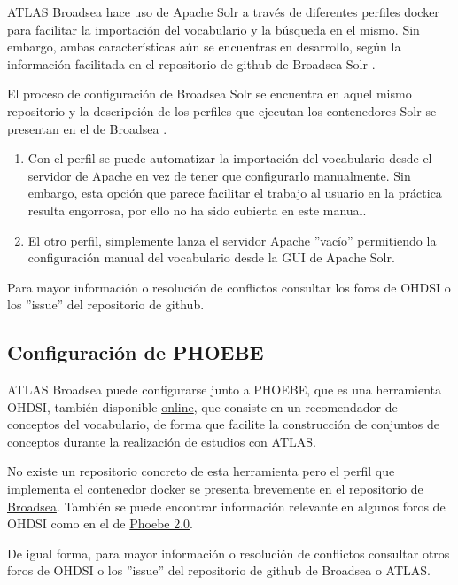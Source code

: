 ATLAS Broadsea hace uso de Apache Solr a través de diferentes perfiles docker para facilitar la importación del vocabulario y la búsqueda en el mismo. Sin embargo, ambas características aún se encuentras en desarrollo, según la información facilitada en el repositorio de github de Broadsea Solr \cite{githubBroadseaSolr}.

El proceso de configuración de Broadsea Solr se encuentra en aquel mismo repositorio y la descripción de los perfiles que ejecutan los contenedores Solr se presentan en el de Broadsea \cite{githubBroadsea}. 

\begin{enumerate}
    \item Con el perfil  se puede automatizar la importación del vocabulario desde el servidor de Apache en vez de tener que configurarlo manualmente. Sin embargo, esta opción que parece facilitar el trabajo al usuario en la práctica resulta engorrosa, por ello no ha sido cubierta en este manual.
    \item El otro perfil,  simplemente lanza el servidor Apache ''vacío'' permitiendo la configuración manual del vocabulario desde la GUI de Apache Solr.
\end{enumerate}

Para mayor información o resolución de conflictos consultar los foros de OHDSI o los ''issue'' del repositorio de github.

\subsection{Configuración de PHOEBE} \label{subsec:05phoebe}

ATLAS Broadsea puede configurarse junto a PHOEBE, que es una herramienta OHDSI, también disponible \href{https://data.ohdsi.org/PHOEBE/}{online}, que consiste en un recomendador de conceptos del vocabulario, de forma que facilite la construcción de conjuntos de conceptos durante la realización de estudios con ATLAS. 

No existe un repositorio concreto de esta herramienta pero el perfil que implementa el contenedor docker se presenta brevemente en el repositorio de \href{https://github.com/OHDSI/Broadsea}{Broadsea}. También se puede encontrar información relevante en algunos foros de OHDSI como en el de \href{https://forums.ohdsi.org/t/phoebe-2-0/17410}{Phoebe 2.0}.

De igual forma, para mayor información o resolución de conflictos consultar otros foros de OHDSI o los ''issue'' del repositorio de github de Broadsea o ATLAS.